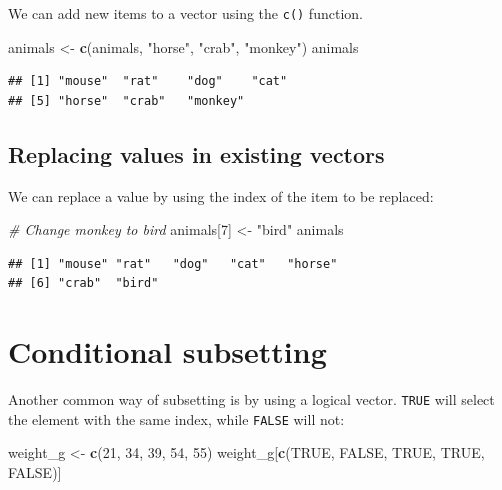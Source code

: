 \documentclass[]{book}
\newenvironment{Shaded}{\begin{snugshade}}{\end{snugshade}}
\newcommand{\CommentTok}[1]{\textcolor[rgb]{0.56,0.35,0.01}{\textit{#1}}}
\newcommand{\DecValTok}[1]{\textcolor[rgb]{0.00,0.00,0.81}{#1}}
\newcommand{\KeywordTok}[1]{\textcolor[rgb]{0.13,0.29,0.53}{\textbf{#1}}}
\newcommand{\NormalTok}[1]{#1}
\newcommand{\OtherTok}[1]{\textcolor[rgb]{0.56,0.35,0.01}{#1}}
\newcommand{\StringTok}[1]{\textcolor[rgb]{0.31,0.60,0.02}{#1}}
\begin{document}
We can add new items to a vector using the \texttt{c()} function.

\begin{Shaded}
\begin{Highlighting}[]
\NormalTok{animals <-}\StringTok{ }\KeywordTok{c}\NormalTok{(animals, }\StringTok{"horse"}\NormalTok{, }\StringTok{"crab"}\NormalTok{, }\StringTok{"monkey"}\NormalTok{)}
\NormalTok{animals}
\end{Highlighting}
\end{Shaded}

\begin{verbatim}
## [1] "mouse"  "rat"    "dog"    "cat"   
## [5] "horse"  "crab"   "monkey"
\end{verbatim}

\hypertarget{replacing-values-in-existing-vectors}{%
\subsection*{Replacing values in existing vectors}\label{replacing-values-in-existing-vectors}}

We can replace a value by using the index of the item to be replaced:

\begin{Shaded}
\begin{Highlighting}[]
\CommentTok{# Change monkey to bird}
\NormalTok{animals[}\DecValTok{7}\NormalTok{] <-}\StringTok{ "bird"}
\NormalTok{animals}
\end{Highlighting}
\end{Shaded}

\begin{verbatim}
## [1] "mouse" "rat"   "dog"   "cat"   "horse"
## [6] "crab"  "bird"
\end{verbatim}

\hypertarget{conditional-subsetting}{%
\section{Conditional subsetting}\label{conditional-subsetting}}

Another common way of subsetting is by using a logical vector. \texttt{TRUE} will select the element with the same index, while \texttt{FALSE} will not:

\begin{Shaded}
\begin{Highlighting}[]
\NormalTok{weight_g <-}\StringTok{ }\KeywordTok{c}\NormalTok{(}\DecValTok{21}\NormalTok{, }\DecValTok{34}\NormalTok{, }\DecValTok{39}\NormalTok{, }\DecValTok{54}\NormalTok{, }\DecValTok{55}\NormalTok{)}
\NormalTok{weight_g[}\KeywordTok{c}\NormalTok{(}\OtherTok{TRUE}\NormalTok{, }\OtherTok{FALSE}\NormalTok{, }\OtherTok{TRUE}\NormalTok{, }\OtherTok{TRUE}\NormalTok{, }\OtherTok{FALSE}\NormalTok{)]}
\end{Highlighting}
\end{Shaded}
\end{document}
